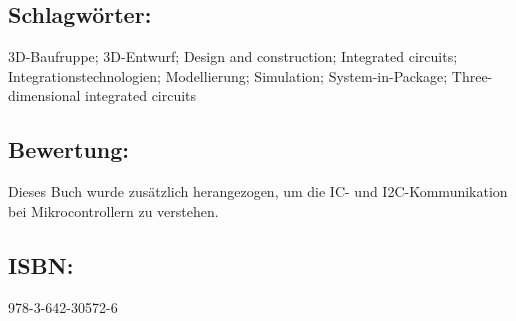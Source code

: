 \subsection*{Schlagwörter:}
3D-Baufruppe; 3D-Entwurf; Design and construction; Integrated circuits; Integrationstechnologien; Modellierung; Simulation; System-in-Package; Three-dimensional integrated circuits
\subsection*{Bewertung:}
Dieses Buch wurde zusätzlich herangezogen, um die IC- und I2C-Kommunikation bei Mikrocontrollern zu verstehen.
\subsection*{ISBN:}
978-3-642-30572-6

